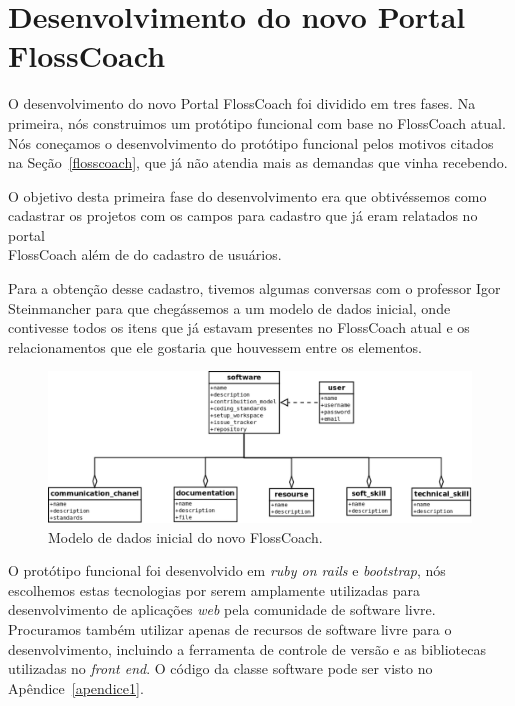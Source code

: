 \chapter{Desenvolvimento do novo Portal \\FlossCoach}
\label{desenvolvimento}

O desenvolvimento do novo Portal FlossCoach foi dividido em tres fases. Na primeira, 
nós construimos um protótipo funcional com base no FlossCoach atual. Nós coneçamos o
desenvolvimento do protótipo funcional pelos motivos citados na Seção~\ref{flosscoach},
que já não atendia mais as demandas que vinha recebendo.

O objetivo desta primeira fase do desenvolvimento era que obtivéssemos como cadastrar 
os projetos com os campos para cadastro que já eram relatados no portal \\FlossCoach 
além de do cadastro de usuários.

Para a obtenção desse cadastro, tivemos algumas conversas com o professor Igor Steinmancher
para que chegássemos a um modelo de dados inicial, onde contivesse todos os itens que 
já estavam presentes no FlossCoach atual e os relacionamentos que ele gostaria que 
houvessem entre os elementos.

\begin{figure}[h]
	\centering
	\label{fig:diagrama_iicial}
		\includegraphics[keepaspectratio=true,scale=0.35]{figuras/diagrama_inicial.eps}
	\caption{Modelo de dados inicial do novo FlossCoach.}
\end{figure}

O protótipo funcional foi desenvolvido em \textit{ruby on rails} e \textit{bootstrap},
nós escolhemos estas tecnologias por serem amplamente utilizadas para desenvolvimento
de aplicações \textit{web} pela comunidade de software livre. Procuramos também utilizar
apenas de recursos de software livre para o desenvolvimento, incluindo a ferramenta de 
controle de versão e as bibliotecas utilizadas no \textit{front end}. O código da classe
software pode ser visto no Apêndice~\ref{apendice1}.

